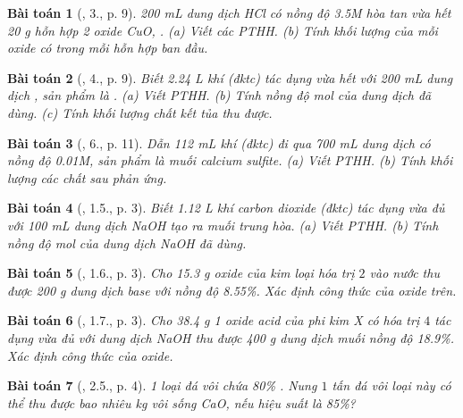 \documentclass{article}
\newtheorem{baitoan}{Bài toán}
\begin{document}
\begin{baitoan}[\cite{SGK_Hoa_Hoc_9}, 3., p. 9]
	\emph{200 mL} dung dịch \emph{HCl} có nồng độ \emph{3.5M} hòa tan vừa hết \emph{20 g} hỗn hợp 2 oxide \emph{CuO, }. (a) Viết các PTHH. (b) Tính khối lượng của mỗi oxide có trong mỗi hỗn hợp ban đầu.
\end{baitoan}

\begin{baitoan}[\cite{SGK_Hoa_Hoc_9}, 4., p. 9]
	Biết \emph{2.24 L} khí \emph{} (đktc) tác dụng vừa hết với \emph{200 mL} dung dịch \emph{}, sản phẩm là \emph{}. (a) Viết PTHH. (b) Tính nồng độ mol của dung dịch \emph{} đã dùng. (c) Tính khối lượng chất kết tủa thu được.
\end{baitoan}

\begin{baitoan}[\cite{SGK_Hoa_Hoc_9}, 6., p. 11]
	Dẫn \emph{112 mL} khí \emph{} (đktc) đi qua \emph{700 mL} dung dịch \emph{} có nồng độ \emph{0.01M}, sản phẩm là muối calcium sulfite. (a) Viết PTHH. (b) Tính khối lượng các chất sau phản ứng.
\end{baitoan}

\begin{baitoan}[\cite{SBT_Hoa_Hoc_9}, 1.5., p. 3]
	Biết \emph{1.12 L} khí carbon dioxide (đktc) tác dụng vừa đủ với \emph{100 mL} dung dịch \emph{NaOH} tạo ra muối trung hòa. (a) Viết PTHH. (b) Tính nồng độ mol của dung dịch \emph{NaOH} đã dùng.	
\end{baitoan}

\begin{baitoan}[\cite{SBT_Hoa_Hoc_9}, 1.6., p. 3]
	Cho \emph{15.3 g} oxide của kim loại hóa trị $2$ vào nước thu được \emph{200 g} dung dịch base với nồng độ \emph{8.55\%}. Xác định công thức của oxide trên.
\end{baitoan}

\begin{baitoan}[\cite{SBT_Hoa_Hoc_9}, 1.7., p. 3]
	Cho \emph{38.4 g} 1 oxide acid của phi kim X có hóa trị $4$ tác dụng vừa đủ với dung dịch \emph{NaOH} thu được \emph{400 g} dung dịch muối nồng độ \emph{18.9\%}. Xác định công thức của oxide.
\end{baitoan}

\begin{baitoan}[\cite{SBT_Hoa_Hoc_9}, 2.5., p. 4]
	1 loại đá vôi chứa \emph{80\% }. Nung $1$ tấn đá vôi loại này có thể thu được bao nhiêu \emph{kg} vôi sống \emph{CaO}, nếu hiệu suất là \emph{85\%}?
\end{baitoan}
\end{document}
